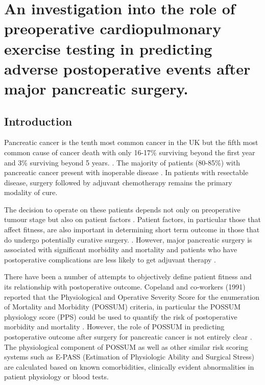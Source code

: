 
\chapter{An investigation into the role of preoperative cardiopulmonary exercise testing in predicting adverse postoperative events after major pancreatic surgery.}
 
\label{ch_cpet_outcomes}
 
\clearpage
 
\section{Introduction}
Pancreatic cancer is the tenth most common cancer in the UK but the fifth most common cause of cancer death with only 16-17\% surviving beyond the first year and 3\% surviving beyond 5 years. \parencite{cancerresearchuk_cancer_2014}. The majority of patients (80-85\%) with pancreatic cancer present with inoperable disease \parencite{cancerresearchuk_cancer_2014, sener_pancreatic_1999}. In patients with resectable disease, surgery \parencite{sener_pancreatic_1999, sohn_resected_2000, geer_prognostic_1993} followed by adjuvant chemotherapy \parencite{neoptolemos_randomized_2004,neoptolemos_adjuvant_2009} remains the primary modality of cure.

The decision to operate on these patients depends not only on preoperative tumour stage but also on patient factors \parencite{bilimoria_national_2007, sandroussi_sociodemographics_2010}. Patient factors, in particular those that affect fitness, are also important in determining short term outcome in those that do undergo potentially curative surgery. \parencite{mann_review_2010, mayo_management_2012}. However, major pancreatic surgery is associated with significant morbidity and mortality and patients who have postoperative complications are less likely to get adjuvant therapy \parencite{teh_patient_2009}.

There have been a number of attempts to objectively define patient fitness and its relationship with postoperative outcome. Copeland and co-workers (1991) reported that the Physiological and Operative Severity Score for the enumeration of Mortality and Morbidity (POSSUM) criteria, in particular the POSSUM physiology score (PPS) could be used to quantify the risk of postoperative morbidity and mortality \parencite{copeland_possum:_1991}. However, the role of POSSUM in predicting postoperative outcome after surgery for pancreatic cancer is not entirely clear \parencite{de_castro_evaluation_2009, khan_evaluation_2003, kocher_risk-adjustment_2005, pratt_possum_2008, tamijmarane_application_2008}. The physiological component of POSSUM as well as other similar risk scoring systems such as E-PASS (Estimation of Physiologic Ability and Surgical Stress)\parencite{haga_estimation_1999} are calculated based on known comorbidities, clinically evident abnormalities in patient physiology or blood tests.


